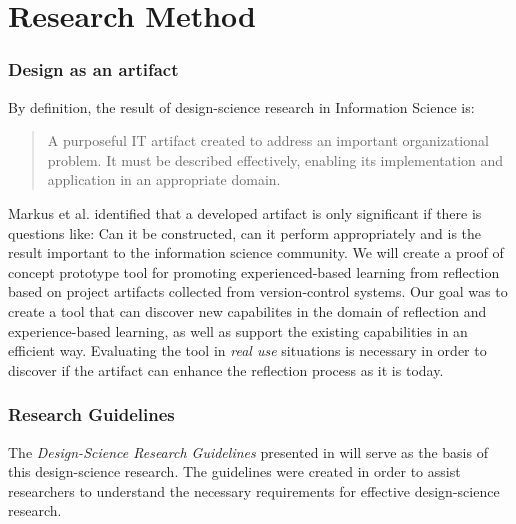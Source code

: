 %
%
\section{Research Method}


\subsubsection{Design as an artifact}
By definition, the result of design-science research in Information Science is:
\begin{quote}
A purposeful IT artifact created to address an important organizational problem. It must be described effectively, enabling its implementation and application in an appropriate domain.
\end{quote}
Markus et al.\cite{markusetal} identified that a developed artifact is only significant if there is questions like: Can it be constructed, can it perform appropriately and is the result important to the information science community. 
We will create a proof of concept prototype tool for promoting experienced-based learning from reflection based on project artifacts collected from version-control systems. Our goal was to create a tool that can discover new capabilites in the domain of reflection and experience-based learning, as well as support the existing capabilities in an efficient way. Evaluating the tool in \emph{real use} situations is necessary in order to discover if the artifact can enhance the reflection process as it is today.

\subsubsection{Research Guidelines}
The \emph{Design-Science Research Guidelines} presented in \cite{Esearch2004} will serve as the basis of this design-science research. The guidelines were created in order to assist researchers to understand the necessary requirements for effective design-science research. 

